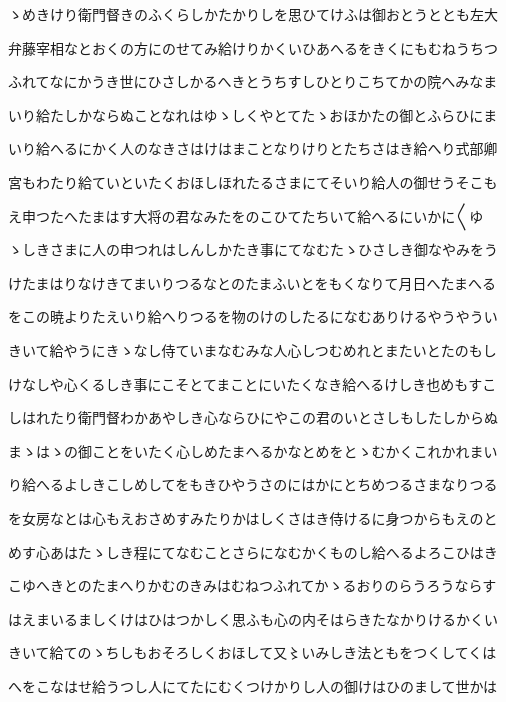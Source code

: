 \documentclass[a4paper,11pt,landscape]{ltjtarticle}
\begin{document}
\par\medskip
ゝめきけり衛門督きのふくらしかたかりしを思ひてけふは御おとうととも左大
\par\medskip
弁藤宰相なとおくの方にのせてみ給けりかくいひあへるをきくにもむねうちつ
\par\medskip
ふれてなにかうき世にひさしかるへきとうちすしひとりこちてかの院へみなま
\par\medskip
いり給たしかならぬことなれはゆゝしくやとてたゝおほかたの御とふらひにま
\par\medskip
いり給へるにかく人のなきさはけはまことなりけりとたちさはき給へり式部卿
\par\medskip
宮もわたり給ていといたくおほしほれたるさまにてそいり給人の御せうそこも
\par\medskip
え申つたへたまはす大将の君なみたをのこひてたちいて給へるにいかに〱ゆ
\par\medskip
ゝしきさまに人の申つれはしんしかたき事にてなむたゝひさしき御なやみをう
\par\medskip
けたまはりなけきてまいりつるなとのたまふいとをもくなりて月日へたまへる
\par\medskip
をこの暁よりたえいり給へりつるを物のけのしたるになむありけるやうやうい
\par\medskip
きいて給やうにきゝなし侍ていまなむみな人心しつむめれとまたいとたのもし
\par\medskip
けなしや心くるしき事にこそとてまことにいたくなき給へるけしき也めもすこ
\par\medskip
しはれたり衛門督わかあやしき心ならひにやこの君のいとさしもしたしからぬ
\par\medskip
まゝはゝの御ことをいたく心しめたまへるかなとめをとゝむかくこれかれまい
\par\medskip
り給へるよしきこしめしてをもきひやうさのにはかにとちめつるさまなりつる
\par\medskip
を女房なとは心もえおさめすみたりかはしくさはき侍けるに身つからもえのと
\par\medskip
めす心あはたゝしき程にてなむことさらになむかくものし給へるよろこひはき
\par\medskip
こゆへきとのたまへりかむのきみはむねつふれてかゝるおりのらうろうならす
\par\medskip
はえまいるましくけはひはつかしく思ふも心の内そはらきたなかりけるかくい
\par\medskip
きいて給てのゝちしもおそろしくおほして又〻いみしき法ともをつくしてくは
\par\medskip
へをこなはせ給うつし人にてたにむくつけかりし人の御けはひのまして世かは
\end{document}
